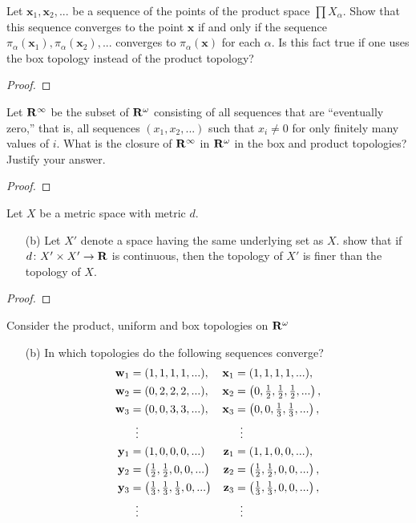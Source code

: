 \newpage
\begin{problem}[Munkres \S19, p.\,118, \#6]
Let $\mathbf{x}_1,\mathbf{x}_2,...$ be a sequence of the points
of the product space $\prod X_\alpha$. Show that this sequence
converges to the point $\mathbf{x}$ if and only if the sequence
$\pi_\alpha(\mathbf{x}_1),\pi_\alpha(\mathbf{x}_2),...$ converges
to $\pi_\alpha(\mathbf{x})$ for each $\alpha$. Is this fact true
if one uses the box topology instead of the product topology?
\end{problem}
\begin{proof}
\end{proof}
\newpage
\begin{problem}[Munkres \S19, p.\,118, \#7]
Let $\mathbf{R}^\infty$ be the subset of $\mathbf{R}^\omega$ consisting of all
sequences that are ``eventually zero,'' that is, all sequences
$(x_1,x_2,...)$ such that $x_i\neq 0$ for only finitely many
values of $i$. What is the closure of $\mathbf{R}^\infty$ in
$\mathbf{R}^\omega$ in the box and product topologies? Justify your
answer.
\end{problem}
\begin{proof}
\end{proof}
\newpage
\begin{problem}[Munkres \S20, p.\,126, \#3(b)]
Let $X$ be a metric space with metric $d$.
\begin{enumerate}[noitemsep]
\item[(b)] Let $X'$ denote a space having the same underlying set
  as $X$. show that if $d\colon X'\times X'\to\mathbf{R}$ is continuous,
  then the topology of $X'$ is finer than the topology of $X$.
\end{enumerate}
\end{problem}
\begin{proof}
\end{proof}
\newpage
\begin{problem}[Munkres \S20, p.\,127, \#4(b)]
Consider the product, uniform and box topologies on $\mathbf{R}^\omega$
\begin{enumerate}[noitemsep]
\item[(b)] In which topologies do the following sequences converge?
\begin{align*}
\mathbf{w}_1&=(1,1,1,1,...),&\mathbf{x}_1&=(1,1,1,1,...),\\
\mathbf{w}_2&=(0,2,2,2,...),&\mathbf{x}_2&=\left(0,\tfrac{1}{2},\tfrac{1}{2},\tfrac{1}{2},...\right),\\
\mathbf{w}_3&=(0,0,3,3,...),&\mathbf{x}_3&=\left(0,0,\tfrac{1}{3},\tfrac{1}{3},...\right),\\
&\vdotswithin{=}&&\vdotswithin{=}\\
\mathbf{y}_1&=(1,0,0,0,...)&\mathbf{z}_1&=(1,1,0,0,...),\\
\mathbf{y}_2&=\left(\tfrac{1}{2},\tfrac{1}{2},0,0,...\right)&\mathbf{z}_2&=\left(\tfrac{1}{2},\tfrac{1}{2},0,0,...\right),\\
\mathbf{y}_3&=\left(\tfrac{1}{3},\tfrac{1}{3},\tfrac{1}{3},0,...\right)&\mathbf{z}_3&=\left(\tfrac{1}{3},\tfrac{1}{3},0,0,...\right),\\
&\vdotswithin{=}&&\vdotswithin{=}
\end{align*}
\end{enumerate}
\end{problem}
